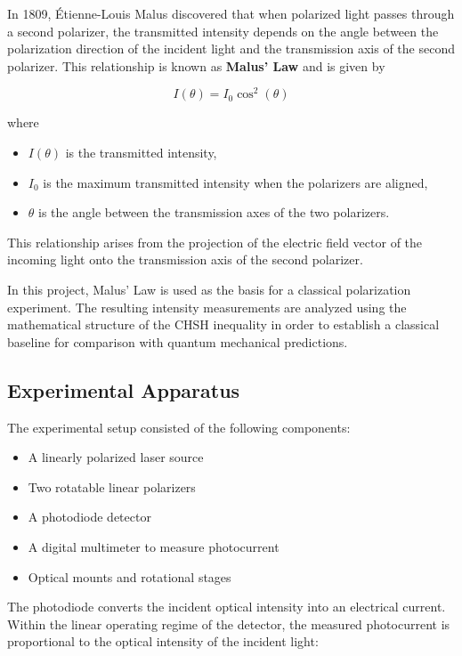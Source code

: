 \documentclass[14pt,a4paper]{extarticle}
\begin{document}
In 1809, Étienne-Louis Malus discovered that when polarized light passes through a second polarizer, the transmitted intensity depends on the angle between the polarization direction of the incident light and the transmission axis of the second polarizer. This relationship is known as \textbf{Malus' Law} and is given by

\[
I(\theta) = I_0 \cos^2(\theta)
\]

where

\begin{itemize}
\item $I(\theta)$ is the transmitted intensity,
\item $I_0$ is the maximum transmitted intensity when the polarizers are aligned,
\item $\theta$ is the angle between the transmission axes of the two polarizers.
\end{itemize}

This relationship arises from the projection of the electric field vector of the incoming light onto the transmission axis of the second polarizer.

In this project, Malus' Law is used as the basis for a classical polarization experiment. The resulting intensity measurements are analyzed using the mathematical structure of the CHSH inequality in order to establish a classical baseline for comparison with quantum mechanical predictions.

\subsection{Experimental Apparatus}

The experimental setup consisted of the following components:

\begin{itemize}
\item A linearly polarized laser source
\item Two rotatable linear polarizers
\item A photodiode detector
\item A digital multimeter to measure photocurrent
\item Optical mounts and rotational stages
\end{itemize}

The photodiode converts the incident optical intensity into an electrical current. Within the linear operating regime of the detector, the measured photocurrent is proportional to the optical intensity of the incident light:
\end{document}

